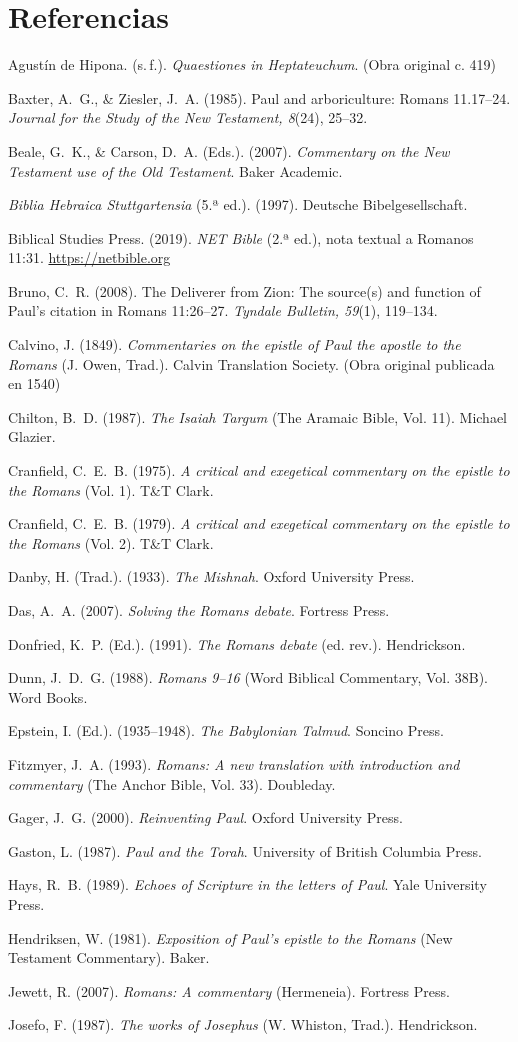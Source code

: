 \documentclass[11pt,letterpaper]{article}
\newcommand{\refapa}[1]{\par{\RaggedRight\hangindent=1.27cm\hangafter=1\noindent #1\par}\vspace{4pt}}
\begin{document}
\section*{Referencias}
\refapa{Agustín de Hipona. (s.\,f.). \emph{Quaestiones in Heptateuchum}. (Obra original c. 419)}
\refapa{Baxter, A.~G., \& Ziesler, J.~A. (1985). Paul and arboriculture: Romans 11.17--24. \emph{Journal for the Study of the New Testament, 8}(24), 25--32.}
\refapa{Beale, G.~K., \& Carson, D.~A. (Eds.). (2007). \emph{Commentary on the New Testament use of the Old Testament}. Baker Academic.}
\refapa{\emph{Biblia Hebraica Stuttgartensia} (5.ª ed.). (1997). Deutsche Bibelgesellschaft.}
\refapa{Biblical Studies Press. (2019). \emph{NET Bible} (2.ª ed.), nota textual a Romanos 11:31. \url{https://netbible.org}}
\refapa{Bruno, C.~R. (2008). The Deliverer from Zion: The source(s) and function of Paul's citation in Romans 11:26--27. \emph{Tyndale Bulletin, 59}(1), 119--134.}
\refapa{Calvino, J. (1849). \emph{Commentaries on the epistle of Paul the apostle to the Romans} (J. Owen, Trad.). Calvin Translation Society. (Obra original publicada en 1540)}
\refapa{Chilton, B.~D. (1987). \emph{The Isaiah Targum} (The Aramaic Bible, Vol. 11). Michael Glazier.}
\refapa{Cranfield, C.~E.~B. (1975). \emph{A critical and exegetical commentary on the epistle to the Romans} (Vol. 1). T\&T Clark.}
\refapa{Cranfield, C.~E.~B. (1979). \emph{A critical and exegetical commentary on the epistle to the Romans} (Vol. 2). T\&T Clark.}
\refapa{Danby, H. (Trad.). (1933). \emph{The Mishnah}. Oxford University Press.}
\refapa{Das, A.~A. (2007). \emph{Solving the Romans debate}. Fortress Press.}
\refapa{Donfried, K.~P. (Ed.). (1991). \emph{The Romans debate} (ed. rev.). Hendrickson.}
\refapa{Dunn, J.~D.~G. (1988). \emph{Romans 9--16} (Word Biblical Commentary, Vol. 38B). Word Books.}
\refapa{Epstein, I. (Ed.). (1935--1948). \emph{The Babylonian Talmud}. Soncino Press.}
\refapa{Fitzmyer, J.~A. (1993). \emph{Romans: A new translation with introduction and commentary} (The Anchor Bible, Vol. 33). Doubleday.}
\refapa{Gager, J.~G. (2000). \emph{Reinventing Paul}. Oxford University Press.}
\refapa{Gaston, L. (1987). \emph{Paul and the Torah}. University of British Columbia Press.}
\refapa{Hays, R.~B. (1989). \emph{Echoes of Scripture in the letters of Paul}. Yale University Press.}
\refapa{Hendriksen, W. (1981). \emph{Exposition of Paul's epistle to the Romans} (New Testament Commentary). Baker.}
\refapa{Jewett, R. (2007). \emph{Romans: A commentary} (Hermeneia). Fortress Press.}
\refapa{Josefo, F. (1987). \emph{The works of Josephus} (W. Whiston, Trad.). Hendrickson.}
\end{document}
